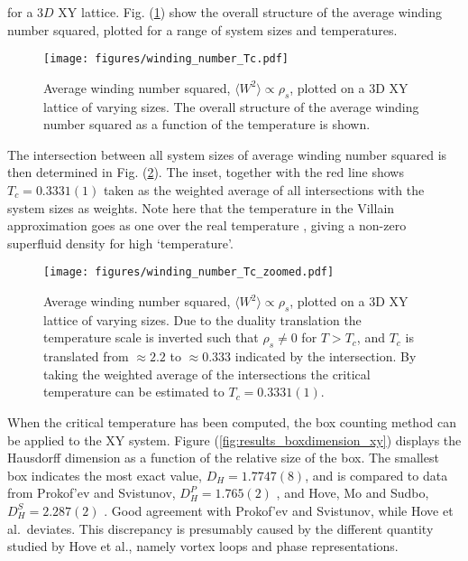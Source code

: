 \noindent for a $3D$ XY lattice. Fig. (\ref{fig:results_windingnumberTc}) show the overall structure of the average winding number squared, plotted for a range of system sizes and temperatures.

\begin{figure}[h!]
    \centering
        \texttt{[image: figures/winding\_number\_Tc.pdf]}
    \caption{Average winding number squared, $\langle W^2 \rangle \propto \rho_s$, plotted on a 3D XY lattice of varying sizes. The overall structure of the average winding number squared as a function of the temperature is shown.}
    \label{fig:results_windingnumberTc}
\end{figure}

\newpage

The intersection between all system sizes of average winding number squared is then determined in Fig. (\ref{fig:results_windingnumberTcZoomed}). The inset, together with the red line shows $T_c = 0.3331(1)$ taken as the weighted average of all intersections with the system sizes as weights. Note here that the temperature in the Villain approximation goes as one over the real temperature \cite{Villain:VillainOriginalPaper}, giving a non-zero superfluid density for high `temperature'.

\begin{figure}[h!]
    \centering
        \texttt{[image: figures/winding\_number\_Tc\_zoomed.pdf]}
    \caption{Average winding number squared, $\langle W^2 \rangle \propto \rho_s$, plotted on a 3D XY lattice of varying sizes. Due to the duality translation the temperature scale is inverted such that $\rho_s \neq 0$ for $T > T_c$, and $T_c$ is translated from $\approx 2.2$ \cite{Gottlob:CritBehaviour3DXY} to $\approx 0.333$ indicated by the intersection. By taking the weighted average of the intersections the critical temperature can be estimated to $T_c = 0.3331(1)$.}
    \label{fig:results_windingnumberTcZoomed}
\end{figure}

\newpage

When the critical temperature has been computed, the box counting method can be applied to the XY system. Figure (\ref{fig:results_boxdimension_xy}) displays the Hausdorff dimension as a function of the relative size of the box. The smallest box indicates the most exact value, $D_H = 1.7747(8)$, and is compared to data from Prokof'ev and Svistunov, $D_H^P = 1.765(2)$ \cite{Prokofev:comment_on_hove_hausdorff_crit_fluct}, and Hove, Mo and Sudbo, $D_H^S = 2.287(2)$  \cite{Hove:hausdorff_crit_fluctuations}. Good agreement with Prokof'ev and Svistunov, while Hove et al.\ deviates. This discrepancy is presumably caused by the different quantity studied by Hove et al., namely vortex loops and phase representations.

